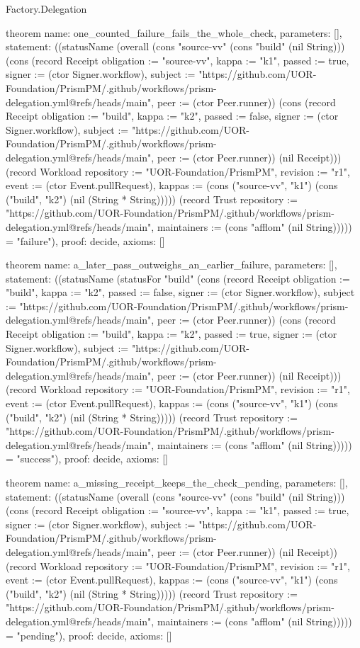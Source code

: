 \begin{lexlean}{Factory.Delegation}
\begin{semanticmodule}
theorem{
  name: one_counted_failure_fails_the_whole_check,
  parameters: [],
  statement: ((statusName (overall (cons "source-vv" (cons "build" (nil String))) (cons (record Receipt {obligation := "source-vv", kappa := "k1", passed := true, signer := (ctor Signer.workflow), subject := "https://github.com/UOR-Foundation/PrismPM/.github/workflows/prism-delegation.yml@refs/heads/main", peer := (ctor Peer.runner)}) (cons (record Receipt {obligation := "build", kappa := "k2", passed := false, signer := (ctor Signer.workflow), subject := "https://github.com/UOR-Foundation/PrismPM/.github/workflows/prism-delegation.yml@refs/heads/main", peer := (ctor Peer.runner)}) (nil Receipt))) (record Workload {repository := "UOR-Foundation/PrismPM", revision := "r1", event := (ctor Event.pullRequest), kappas := (cons ("source-vv", "k1") (cons ("build", "k2") (nil (String * String))))}) (record Trust {repository := "https://github.com/UOR-Foundation/PrismPM/.github/workflows/prism-delegation.yml@refs/heads/main", maintainers := (cons "afflom" (nil String))}))) = "failure"),
  proof: decide{},
  axioms: []
}

theorem{
  name: a_later_pass_outweighs_an_earlier_failure,
  parameters: [],
  statement: ((statusName (statusFor "build" (cons (record Receipt {obligation := "build", kappa := "k2", passed := false, signer := (ctor Signer.workflow), subject := "https://github.com/UOR-Foundation/PrismPM/.github/workflows/prism-delegation.yml@refs/heads/main", peer := (ctor Peer.runner)}) (cons (record Receipt {obligation := "build", kappa := "k2", passed := true, signer := (ctor Signer.workflow), subject := "https://github.com/UOR-Foundation/PrismPM/.github/workflows/prism-delegation.yml@refs/heads/main", peer := (ctor Peer.runner)}) (nil Receipt))) (record Workload {repository := "UOR-Foundation/PrismPM", revision := "r1", event := (ctor Event.pullRequest), kappas := (cons ("source-vv", "k1") (cons ("build", "k2") (nil (String * String))))}) (record Trust {repository := "https://github.com/UOR-Foundation/PrismPM/.github/workflows/prism-delegation.yml@refs/heads/main", maintainers := (cons "afflom" (nil String))}))) = "success"),
  proof: decide{},
  axioms: []
}

theorem{
  name: a_missing_receipt_keeps_the_check_pending,
  parameters: [],
  statement: ((statusName (overall (cons "source-vv" (cons "build" (nil String))) (cons (record Receipt {obligation := "source-vv", kappa := "k1", passed := true, signer := (ctor Signer.workflow), subject := "https://github.com/UOR-Foundation/PrismPM/.github/workflows/prism-delegation.yml@refs/heads/main", peer := (ctor Peer.runner)}) (nil Receipt)) (record Workload {repository := "UOR-Foundation/PrismPM", revision := "r1", event := (ctor Event.pullRequest), kappas := (cons ("source-vv", "k1") (cons ("build", "k2") (nil (String * String))))}) (record Trust {repository := "https://github.com/UOR-Foundation/PrismPM/.github/workflows/prism-delegation.yml@refs/heads/main", maintainers := (cons "afflom" (nil String))}))) = "pending"),
  proof: decide{},
  axioms: []
}


\end{semanticmodule}
\end{lexlean}
